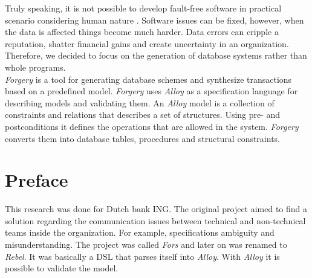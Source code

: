 \documentclass[oneside]{book}
\begin{document}
Truly speaking, it is not possible to develop fault-free software in practical scenario considering human nature \cite{reliability}.
Software issues can be fixed, however, when the data is affected things become much harder. Data errors can cripple a reputation, shatter financial gains and create uncertainty in an organization. 	Therefore, we decided to focus on the generation of database systems rather than whole programs.\\

\textit{Forgery} is a tool for generating database schemes and synthesize transactions based on a predefined model. \textit{Forgery} uses \textit{Alloy} as a specification language for describing models and validating them. An \textit{Alloy} model is a collection of constraints and relations that describes a set of structures. Using pre- and postconditions it defines the operations that are allowed in the system. \textit{Forgery} converts them into database tables, procedures and structural constraints.

\newpage

\chapter{Preface}
This research was done for Dutch bank ING. The original project aimed  to find a solution regarding the communication issues between technical and non-technical teams inside the organization. For example, specifications ambiguity and misunderstanding. The project was called \textit{Fors} and later on was renamed to \textit{Rebel}. It was basically a DSL that parses itself into \textit{Alloy}. With \textit{Alloy} it is possible to validate the model.\\
\end{document}

